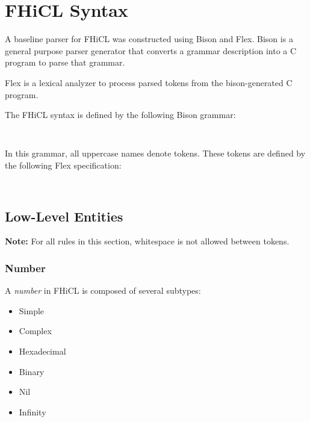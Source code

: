 \documentclass{memarticle}
\begin{document}
\chapter{FHiCL Syntax}{

        A baseline parser for FHiCL was constructed using Bison and Flex.
        Bison is a general purpose parser generator that converts a grammar description into
        a C program to parse that grammar.
        \par
        Flex is a lexical analyzer to process parsed tokens from the bison-generated C program.
        \par
        The FHiCL syntax is defined by the following Bison grammar:
        \begin{verbatim}
        
        \end{verbatim}

        In this grammar,
        all uppercase names denote tokens.
        These tokens are defined by the following Flex specification:
        \begin{verbatim}
        
        \end{verbatim}

        \section{Low-Level Entities}
                \textbf{ Note: } For all rules in this section,
                whitespace is not allowed between tokens.
		\subsection{Number}
			A \emph{number} in FHiCL is composed of several subtypes:
			\begin{itemize}
				\item Simple
				\item Complex
				\item Hexadecimal
				\item Binary
				\item Nil
				\item Infinity
			\end{itemize}
}
\end{document}
